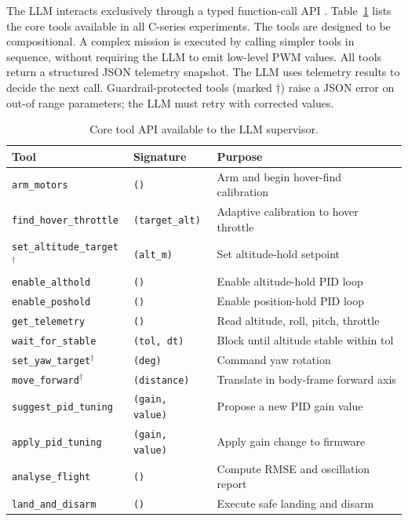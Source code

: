 The LLM interacts exclusively through a typed function-call API \cite{vemprala2023chatgpt}. 
Table~\ref{tab:ch3_tools} lists the core tools available in all C-series experiments. 
The tools are designed to be compositional.
A complex mission is executed by calling simpler tools in sequence, without requiring the LLM to emit low-level PWM values. 
All tools return a structured JSON telemetry snapshot.
The LLM uses telemetry results to decide the next call.
Guardrail-protected tools (marked $\dagger$) raise a JSON error on out-of range parameters; the LLM must retry with corrected values.

\begin{table}[ht]
  \caption{Core tool API available to the LLM supervisor.}
  \label{tab:ch3_tools}
  \centering
  \small
  \begin{tabular}{lll}
    \toprule
    Tool & Signature & Purpose \\
    \midrule
    \texttt{arm\_motors}            & \texttt{()} & Arm and begin hover-find calibration \\
    \texttt{find\_hover\_throttle}  & \texttt{(target\_alt)} & Adaptive calibration to hover throttle \\
    \texttt{set\_altitude\_target}$^\dagger$ & \texttt{(alt\_m)} & Set altitude-hold setpoint \\
    \texttt{enable\_althold}        & \texttt{()} & Enable altitude-hold PID loop \\
    \texttt{enable\_poshold}        & \texttt{()} & Enable position-hold PID loop \\
    \texttt{get\_telemetry}         & \texttt{()} & Read altitude, roll, pitch, throttle \\
    \texttt{wait\_for\_stable}      & \texttt{(tol, dt)} & Block until altitude stable within tol \\
    \texttt{set\_yaw\_target}$^\dagger$ & \texttt{(deg)} & Command yaw rotation \\
    \texttt{move\_forward}$^\dagger$ & \texttt{(distance)} & Translate in body-frame forward axis \\
    \texttt{suggest\_pid\_tuning}   & \texttt{(gain, value)} & Propose a new PID gain value \\
    \texttt{apply\_pid\_tuning}     & \texttt{(gain, value)} & Apply gain change to firmware \\
    \texttt{analyse\_flight}        & \texttt{()} & Compute RMSE and oscillation report \\
    \texttt{land\_and\_disarm}      & \texttt{()} & Execute safe landing and disarm \\
    \bottomrule
  \end{tabular}
\end{table}

